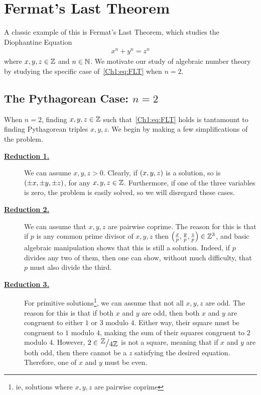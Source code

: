 \section{Fermat's Last Theorem}

A classic example of this is Fermat's Last Theorem, which studies the Diophantine Equation
\begin{align}
    x^n + y^n = z^n
    \label{Ch1:eq:FLT}
\end{align}
where $x, y, z \in \mathbb{Z}$ and $n \in \mathbb{N}$. We motivate our study of algebraic number theory by studying the specific case of~\eqref{Ch1:eq:FLT} when $n = 2$.

\subsection{The Pythagorean Case: $n = 2$}

When $n = 2$, finding $x, y, z \in \mathbb{Z}$ such that~\eqref{Ch1:eq:FLT} holds is tantamount to finding Pythagorean triples $x, y, z$. We begin by making a few simplifications of the problem.

\begin{description}
    \item[\textbf{\underline{Reduction 1.}}] We can assume $x, y, z > 0$. Clearly, if $\left( x, y, z \right)$ is a solution, so is $\left( \pm x, \pm y, \pm z \right)$, for any $x, y, z \in \mathbb{Z}$. Furthermore, if one of the three variables is zero, the problem is easily solved, so we will disregard these cases.

    \item[\textbf{\underline{Reduction 2.}}] We can assume that $x, y, z$ are pairwise coprime. The reason for this is that if $p$ is any common prime divisor of $x, y, z$ then $\left( \frac{x}{p}, \frac{y}{p}, \frac{z}{p} \right) \in \mathbb{Z}^3$, and basic algebraic manipulation shows that this is still a solution. Indeed, if $p$ divides any two of them, then one can show, without much difficulty, that $p$ must also divide the third.

    \item[\textbf{\underline{Reduction 3.}}] For primitive solutions\footnote{ie, solutions where $x, y, z$ are pairwise coprime}, we can assume that not all $x, y, z$ are odd. The reason for this is that if both $x$ and $y$ are odd, then both $x$ and $y$ are congruent to either $1$ or $3$ modulo $4$. Either way, their square must be congruent to $1$ modulo $4$, making the sum of their squares congruent to $2$ modulo $4$. However, $2 \in \quotient{\Z}{4\Z}$ is not a square, meaning that if $x$ and $y$ are both odd, then there cannot be a $z$ satisfying the desired equation. Therefore, one of $x$ and $y$ must be even.
\end{description}

